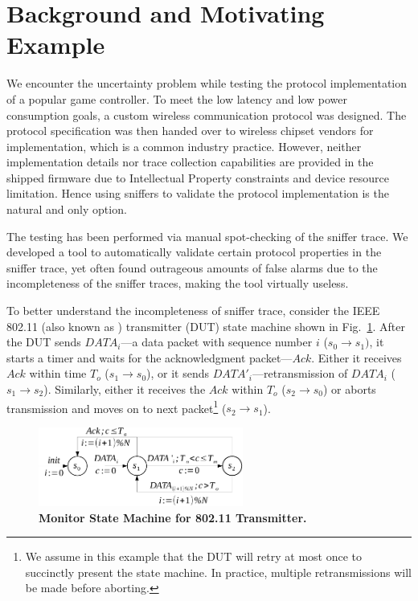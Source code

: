 \section{Background and Motivating Example}
\label{sec:motivation}

We encounter the uncertainty problem while testing the protocol implementation of a popular
game controller. To meet the low latency and low power consumption goals, a custom
wireless communication protocol was designed. The protocol specification was
then handed over to wireless chipset vendors for implementation, which is a
common industry practice. However, neither implementation details nor trace
collection capabilities are provided in the shipped firmware due to Intellectual
Property constraints and device resource limitation. Hence using sniffers to
validate the protocol implementation is the natural and only option.

The testing has been performed via manual spot-checking of the sniffer trace.
We developed a tool to automatically validate certain protocol properties in the
sniffer trace, yet often found outrageous amounts of false alarms due to the
incompleteness of the sniffer traces, making the tool virtually useless.

To better understand the incompleteness of sniffer trace, consider the IEEE
802.11 (also known as \wifi{}) transmitter (DUT) state machine shown in
Fig.~\ref{fig:dot11_tx_ta}. After the DUT sends $DATA_i$---a data packet with
sequence number $i$ ($s_0\rightarrow s_1)$, it starts a timer and waits for the
acknowledgment packet---$Ack$. Either it receives $Ack$ within time $T_o$
($s_1\rightarrow s_0$), or it sends $DATA'_i$---retransmission of $DATA_i$
($s_1\rightarrow s_2$). Similarly, either it receives the $Ack$ within $T_o$
($s_2\rightarrow s_0$) or aborts transmission and moves on to next
packet\footnote{We assume in this example that the DUT will retry at most once
to succinctly present the state machine. In practice, multiple
retransmissions will be made before aborting.} ($s_2\rightarrow s_1$).

\begin{figure}[H]
  \centering
  \includegraphics[width=0.6\textwidth]{./figures/dot11_tx_ta.pdf}
  \caption{\textbf{Monitor State Machine for 802.11 Transmitter.}}
  \label{fig:dot11_tx_ta}
  \vspace*{-5mm}
\end{figure}

